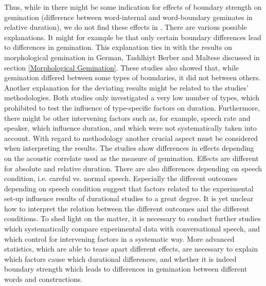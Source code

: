 Thus, while in \cite{Oh.2012} there might be some indication for effects of boundary strength on gemination (difference between word-internal and word-boundary geminates in relative duration), we do not find these effects in \cite{Oh.2013}. There are various possible explanations. 
It might for example be that only certain boundary differences lead to differences in gemination. This explanation ties in with the results on morphological gemination in German, Tashlhiyt Berber and Maltese discussed in section \ref{Morphological Gemination}. These studies also showed that, while gemination differed between some types of boundaries, it did not between others. 
Another explanation for the deviating results might be related to the studies' methodologies.  
Both studies only investigated a very low number of types, which prohibited to test the influence of type-specific factors on duration. Furthermore, there might be other intervening factors such as, for example, speech rate and speaker, which influence duration, and which were not systematically  taken into account. 
With regard to methodology another crucial aspect must be considered when interpreting the results.
The studies show differences in effects depending on the acoustic correlate used as the measure of gemination. Effects are different for absolute and relative duration. There are also differences depending on speech condition, i.e. careful vs. normal speech. 
Especially the different outcomes depending on speech condition suggest that factors related to the experimental set-up influence results of durational studies to a great degree. It is yet unclear how to interpret the relation between the different outcomes and the different conditions.
To shed light on the matter, it is necessary to conduct further studies which systematically compare experimental data with conversational speech, and which control for intervening factors in a systematic way. More advanced statistics, which are able to tease apart different effects, are necessary to explain which factors cause which durational differences, and whether it is indeed boundary strength which leads to differences in gemination between different words and constructions.



